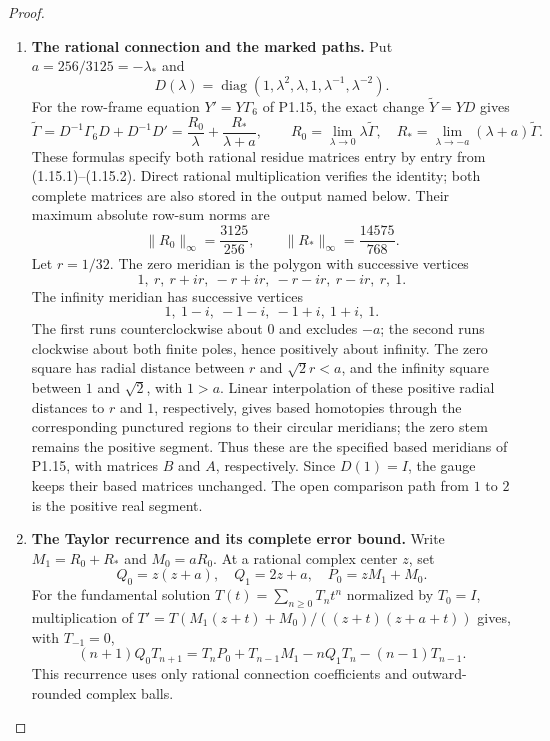 \begin{proof}
\begin{enumerate}[label=\arabic*.]
\item \textbf{The rational connection and the marked paths.}
Put $a=256/3125=-\lambda_*$ and
\[
 D(\lambda)=\operatorname{diag}(1,\lambda^2,\lambda,1,
                              \lambda^{-1},\lambda^{-2}).
\]
For the row-frame equation $Y'=Y\Gamma_6$ of P1.15, the exact
change $\widetilde Y=YD$ gives
\[
 \widetilde\Gamma
 =D^{-1}\Gamma_6D+D^{-1}D'
 =\frac{R_0}{\lambda}+\frac{R_*}{\lambda+a},\qquad
 R_0=\lim_{\lambda\to0}\lambda\widetilde\Gamma,
 \quad R_*=\lim_{\lambda\to-a}(\lambda+a)\widetilde\Gamma.
\]
These formulas specify both rational residue matrices entry by entry
from (1.15.1)--(1.15.2).  Direct rational multiplication verifies the
identity; both complete matrices are also stored in the output named
below.  Their maximum absolute row-sum norms are
\[
 \|R_0\|_\infty=\frac{3125}{256},\qquad
 \|R_*\|_\infty=\frac{14575}{768}.
\]
Let $r=1/32$.  The zero meridian is the polygon with successive
vertices
\[
 1,\ r,\ r+ir,\ -r+ir,\ -r-ir,\ r-ir,\ r,\ 1.
\]
The infinity meridian has successive vertices
\[
 1,\ 1-i,\ -1-i,\ -1+i,\ 1+i,\ 1.
\]
The first runs counterclockwise about $0$ and excludes $-a$; the
second runs clockwise about both finite poles, hence positively
about infinity.  The zero square has radial distance between $r$
and $\sqrt2r<a$, and the infinity square between $1$ and $\sqrt2$,
with $1>a$.  Linear interpolation of these positive radial distances
to $r$ and $1$, respectively, gives based homotopies through the
corresponding punctured regions to their circular meridians; the
zero stem remains the positive segment.  Thus these are the specified
based meridians of P1.15, with matrices $B$ and $A$, respectively.
Since $D(1)=I$, the gauge
keeps their based matrices unchanged.  The open comparison path
from $1$ to $2$ is the positive real segment.

\item \textbf{The Taylor recurrence and its complete error bound.}
Write $M_1=R_0+R_*$ and $M_0=aR_0$.  At a rational complex center
$z$, set
\[
 Q_0=z(z+a),\quad Q_1=2z+a,\quad P_0=zM_1+M_0.
\]
For the fundamental solution $T(t)=\sum_{n\ge0}T_nt^n$ normalized
by $T_0=I$, multiplication of
$T'=T(M_1(z+t)+M_0)/((z+t)(z+a+t))$ gives, with $T_{-1}=0$,
\[
 (n+1)Q_0T_{n+1}
 =T_nP_0+T_{n-1}M_1-nQ_1T_n-(n-1)T_{n-1}.
\]
This recurrence uses only rational connection coefficients and
outward-rounded complex balls.


\end{enumerate}
\end{proof}
